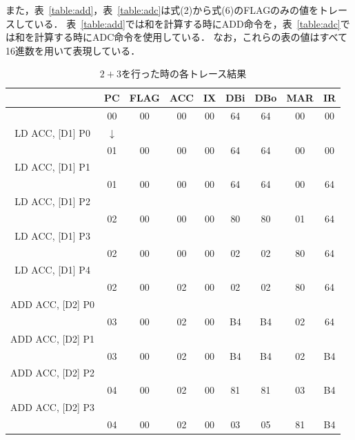 \documentclass[dvipdfmx]{jsarticle}
\begin{document}
また，表~\ref{table:add}，表~\ref{table:adc}は式(2)から式(6)のFLAGのみの値をトレースしている．
表~\ref{table:add}では和を計算する時にADD命令を，表~\ref{table:adc}では和を計算する時にADC命令を使用している．
なお，これらの表の値はすべて16進数を用いて表現している．
\begin{table}[H]
    \caption{$2+3$を行った時の各トレース結果}
    \label{table:trace_all}
    \centering
    \begin{tabular}{|c|c|c|c|c|c|c|c|c|}
        \hline
           & PC & FLAG & ACC & IX & DBi & DBo & MAR & IR \\
           \hline\hline
           & 00 & 00 & 00 & 00 & 64 & 64 & 00 & 00 \\
           \hline
           LD ACC, [D1] P0 &$\downarrow$&&&&&&& \\
           \hline
           & 01 & 00 & 00 & 00 & 64 & 64 & 00 & 00 \\
           \hline
           LD ACC, [D1] P1 &&&&&&&& \\
           \hline
           & 01 & 00 & 00 & 00 & 64 & 64 & 00 & 64 \\
           \hline
           LD ACC, [D1] P2 &&&&&&&& \\
           \hline
           & 02 & 00 & 00 & 00 & 80 & 80 & 01 & 64 \\
           \hline
           LD ACC, [D1] P3 &&&&&&&& \\
           \hline
           & 02 & 00 & 00 & 00 & 02 & 02 & 80 & 64 \\
           \hline
           LD ACC, [D1] P4 &&&&&&&& \\
           \hline
           & 02 & 00 & 02 & 00 & 02 & 02 & 80 & 64 \\
           \hline
           ADD ACC, [D2] P0 &&&&&&&& \\
           \hline
           & 03 & 00 & 02 & 00 & B4 & B4 & 02 & 64 \\
           \hline
           ADD ACC, [D2] P1 &&&&&&&& \\
           \hline
           & 03 & 00 & 02 & 00 & B4 & B4 & 02 & B4 \\
           \hline
           ADD ACC, [D2] P2 &&&&&&&& \\
           \hline
           & 04 & 00 & 02 & 00 & 81 & 81 & 03 & B4 \\
           \hline
           ADD ACC, [D2] P3 &&&&&&&& \\
           \hline
           & 04 & 00 & 02 & 00 & 03 & 05 & 81 & B4 \\

\end{tabular}
\end{table}
\end{document}
